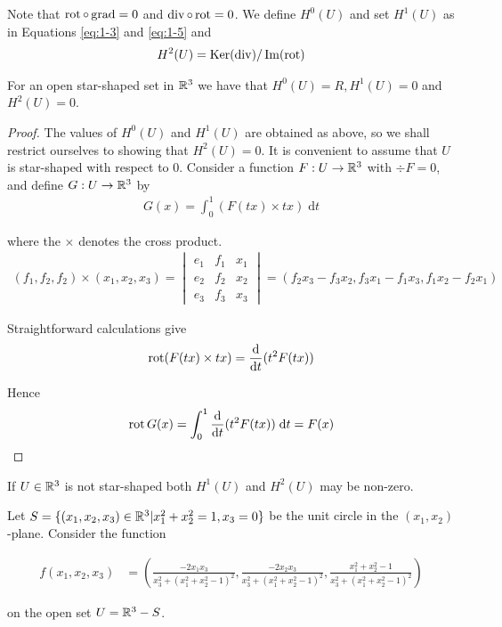 Note that $\operatorname{rot}\circ\operatorname{grad} = 0$ and $\operatorname{div}\circ\operatorname{rot} = 0$. We define $H^0(U)$ and set $H^1(U)$ as in 
Equations \eqref{eq:1-3} and \eqref{eq:1-5} and
\begin{align*}
  H^2(U) = \operatorname{Ker}(\operatorname{div})/\operatorname{Im}(\operatorname{rot})
\end{align*}


\begin{theorem}
  For an open star-shaped set in $\mathbb{R}^3$ we have that $H^0(U) = R, H^1(U) = 0$ and $H^2(U) = 0$.
\end{theorem}

\begin{proof}
  The values of $H^0(U)$ and $H^1(U)$ are obtained as above, so we shall
restrict ourselves to showing that $H^2(U) = 0$. It is convenient to assume that $U$
is star-shaped with respect to 0. Consider a function $F:U\to\mathbb{R}^3$ with $\div F = 0$,
and define $G:U\to\mathbb{R}^3$ by 
\begin{align*}
  G(x) = \int_{0}^{1}{(F(tx)\times tx ) \;\mathrm{d}t}
\end{align*}

where the $\times$ denotes the cross product.
\begin{align*}
  (f_1, f_2, f_2)\times (x_1, x_2, x_3) 
  = \begin{vmatrix}
      e_1 & f_1 & x_1 \\
      e_2 & f_2 & x_2 \\
      e_3 & f_3 & x_3
    \end{vmatrix}
  = (f_2x_3 - f_3x_2, f_3x_1 - f_1x_3, f_1x_2 - f_2x_1)
\end{align*}

Straightforward calculations give
\begin{align*}
  \operatorname{rot}(F(tx)\times tx) = \frac{\mathrm{d} }{\mathrm{d} t} (t^2F(tx))
\end{align*}

Hence
\begin{align*}
  \operatorname{rot} G(x) 
  = \int_{0}^{1}{\frac{\mathrm{d} }{\mathrm{d} t} (t^2F(tx)) \;\mathrm{d}t} 
  = F(x)
\end{align*}
\end{proof}

If $U\in\mathbb{R}^3$ is not star-shaped both $H^1(U)$ and $H^2(U)$ may be non-zero.

\begin{example}
  Let $S = \{(x_1, x_2, x_3)\in \mathbb{R}^3| x_1^2 + x_2^2 = 1, x_3 = 0\}$ be the unit circle
in the $(x_1, x_2)$-plane. Consider the function

\begin{align*}
  f(x_1,x_2,x_3)
  & = \left(\frac{-2x_1x_3}{x_3^2+\left(x_1^2+x_2^2-1\right)^2},\frac{-2x_2x_3}{x_3^2+\left(x_1^2+x_2^2-1\right)^2},\frac{x_1^2+x_2^2-1}{x_3^2+\left(x_1^2+x_2^2-1\right)^2}\right)
\end{align*}

on the open set $U = \mathbb{R}^3 - S$.
\end{example}

